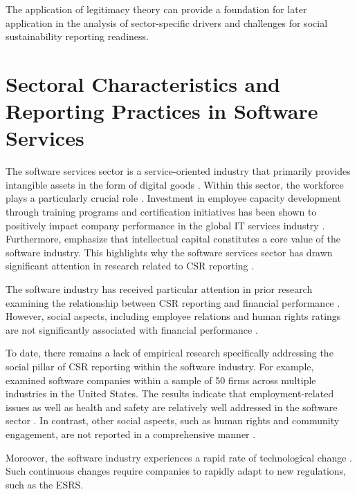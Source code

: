 The application of legitimacy theory can provide a foundation for later application in the analysis of sector-specific drivers 
and challenges for social sustainability reporting readiness.



\section{Sectoral Characteristics and Reporting Practices in Software Services}

The software services sector is a service-oriented industry that primarily provides intangible assets 
in the form of digital goods \parencite{Buxmann2015}. Within this sector, the workforce plays a particularly 
crucial role \parencite{Buxmann2015}. Investment in employee capacity development through training programs 
and certification initiatives has been shown to positively impact company performance in the global IT 
services industry \parencite{Chatterjee2017}. Furthermore, \textcite{Nowak2000} emphasize that intellectual 
capital constitutes a core value of the software industry. This highlights why the software services sector 
has drawn significant attention in research related to CSR reporting \parencite{Holder-Webb2009}.

The software industry has received particular attention in prior research examining the relationship 
between CSR reporting and financial performance \parencite{Okafor2021}.
However, social aspects, including employee relations and human rights ratings are not significantly associated 
with financial performance \parencite{Okafor2021}.

To date, there remains a lack of empirical research specifically addressing the social pillar of CSR reporting 
within the software industry. For example, \textcite{Holder-Webb2009} examined software companies within a sample 
of 50 firms across multiple industries in the United States. The results indicate that employment-related issues 
as well as health and safety are relatively well addressed in the software sector \parencite{Holder-Webb2009}. 
In contrast, other social aspects, such as human rights and community engagement, are not reported in a 
comprehensive manner \parencite{Holder-Webb2009}.

Moreover, the software industry experiences a rapid rate of technological change \parencite{Li2010}.
Such continuous changes require companies to rapidly adapt to new regulations, such as the ESRS. 

